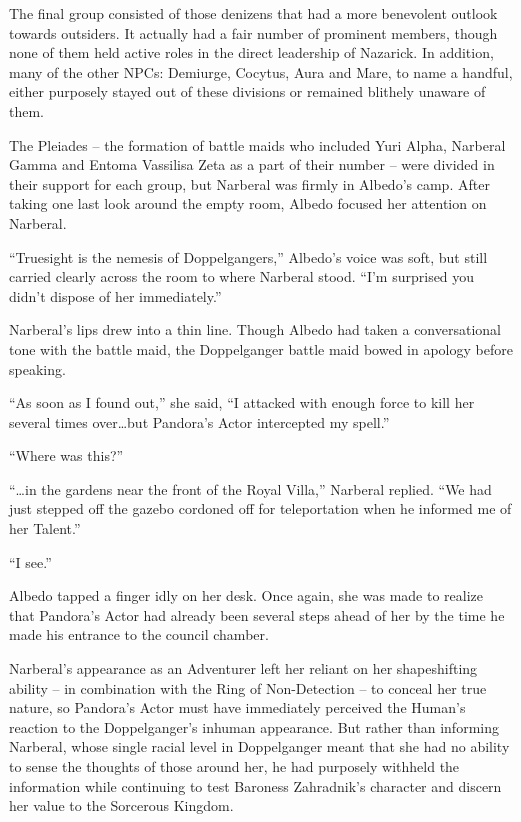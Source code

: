  

The final group consisted of those denizens that had a more benevolent outlook towards outsiders. It actually had a fair number of prominent members, though none of them held active roles in the direct leadership of Nazarick. In addition, many of the other NPCs: Demiurge, Cocytus, Aura and Mare, to name a handful, either purposely stayed out of these divisions or remained blithely unaware of them.

 

The Pleiades – the formation of battle maids who included Yuri Alpha, Narberal Gamma and Entoma Vassilisa Zeta as a part of their number – were divided in their support for each group, but Narberal was firmly in Albedo’s camp. After taking one last look around the empty room, Albedo focused her attention on Narberal.

 

“Truesight is the nemesis of Doppelgangers,” Albedo’s voice was soft, but still carried clearly across the room to where Narberal stood. “I’m surprised you didn’t dispose of her immediately.”

 

Narberal’s lips drew into a thin line. Though Albedo had taken a conversational tone with the battle maid, the Doppelganger battle maid bowed in apology before speaking.

 

“As soon as I found out,” she said, “I attacked with enough force to kill her several times over…but Pandora’s Actor intercepted my spell.”

 

“Where was this?”

 

“…in the gardens near the front of the Royal Villa,” Narberal replied. “We had just stepped off the gazebo cordoned off for teleportation when he informed me of her Talent.”

 

“I see.”

 

Albedo tapped a finger idly on her desk. Once again, she was made to realize that Pandora’s Actor had already been several steps ahead of her by the time he made his entrance to the council chamber.

 

Narberal’s appearance as an Adventurer left her reliant on her shapeshifting ability – in combination with the Ring of Non-Detection – to conceal her true nature, so Pandora’s Actor must have immediately perceived the Human’s reaction to the Doppelganger’s inhuman appearance. But rather than informing Narberal, whose single racial level in Doppelganger meant that she had no ability to sense the thoughts of those around her, he had purposely withheld the information while continuing to test Baroness Zahradnik’s character and discern her value to the Sorcerous Kingdom.

